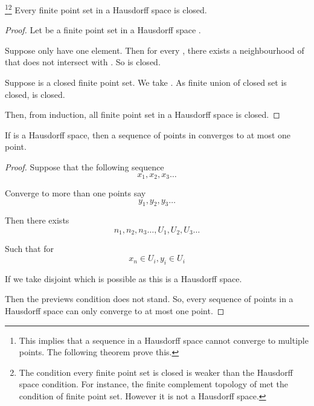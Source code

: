 \begin{theorem}\footnote{
      This implies that a sequence in a Hausdorff space cannot converge to multiple points. The following theorem prove this.
}\footnote{
      The condition every finite point set is closed is weaker than the Hausdorff space condition. For instance, the finite complement topology of  met the condition of finite point set. However it is not a Hausdorff space.
}
      Every finite point set in a Hausdorff space  is closed.
\end{theorem}

\begin{proof}
      Let  be a finite point set in a Hausdorff space .

      Suppose  only have one element. Then for every , there exists a neighbourhood of  that does not intersect with . So  is closed.

      Suppose  is a closed finite point set. We take . As finite union of closed set is closed,  is closed.

      Then, from induction, all finite point set in a Hausdorff space is closed.
\end{proof}

\begin{theorem}
      If  is a Hausdorff space, then a sequence of points in  converges to at most one point.
\end{theorem}

\begin{proof}
      Suppose that the following sequence
      \begin{equation*}
            x_{1}, x_{2}, x_{3}\dots
      \end{equation*}

      Converge to more than one points say 
      \begin{equation*}
            y_{1}, y_{2}, y_{3}\dots
      \end{equation*}

      Then there exists 
      \begin{equation*}
            n_{1}, n_{2}, n_{3}\dots, U_{1}, U_{2}, U_{3}\dots
      \end{equation*}

      Such that for 
      \begin{equation*}
            x_{n} \in U_{i}, y_{i} \in U_{i}
      \end{equation*}

      If we take disjoint  which is possible as this is a Hausdorff space.

      Then the previews condition does not stand. So, every sequence of points in a Hausdorff space can only converge to at most one point.
\end{proof}

